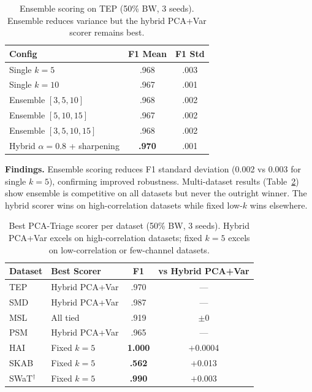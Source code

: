 \documentclass[journal]{IEEEtran}
\begin{document}
\begin{table}[t]
\centering
\caption{Ensemble scoring on TEP (50\% BW, 3 seeds). Ensemble reduces variance but the hybrid PCA+Var scorer remains best.}
\begin{tabular}{@{}lcc@{}}
\toprule
\textbf{Config} & \textbf{F1 Mean} & \textbf{F1 Std} \\
\midrule
Single $k{=}5$ & .968 & .003 \\
Single $k{=}10$ & .967 & .001 \\
Ensemble $[3,5,10]$ & .968 & .002 \\
Ensemble $[5,10,15]$ & .967 & .002 \\
Ensemble $[3,5,10,15]$ & .968 & .002 \\
\midrule
Hybrid $\alpha{=}0.8$ + sharpening & \textbf{.970} & .001 \\
\bottomrule
\end{tabular}
\label{tab:ensemble}
\end{table}

\textbf{Findings.} Ensemble scoring reduces F1 standard deviation (0.002 vs 0.003 for single $k{=}5$), confirming improved robustness. Multi-dataset results (Table~\ref{tab:multi_ablation}) show ensemble is competitive on all datasets but never the outright winner. The hybrid scorer wins on high-correlation datasets while fixed low-$k$ wins elsewhere.

\begin{table}[t]
\centering
\caption{Best PCA-Triage scorer per dataset (50\% BW, 3 seeds). Hybrid PCA+Var excels on high-correlation datasets; fixed $k{=}5$ excels on low-correlation or few-channel datasets.}
\begin{tabular}{@{}llcc@{}}
\toprule
\textbf{Dataset} & \textbf{Best Scorer} & \textbf{F1} & \textbf{vs Hybrid PCA+Var} \\
\midrule
TEP & Hybrid PCA+Var & .970 & --- \\
SMD & Hybrid PCA+Var & .987 & --- \\
MSL & All tied & .919 & $\pm$0 \\
PSM & Hybrid PCA+Var & .965 & --- \\
HAI & Fixed $k{=}5$ & \textbf{1.000} & $+$0.0004 \\
SKAB & Fixed $k{=}5$ & \textbf{.562} & $+$0.013 \\
SWaT$^\dagger$ & Fixed $k{=}5$ & \textbf{.990} & $+$0.003 \\
\bottomrule
\end{tabular}
\label{tab:multi_ablation}
\end{table}
\end{document}
